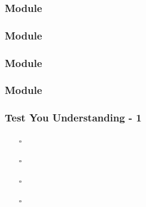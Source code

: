 \documentclass[t, notes, xcolor=table]{beamer}
\begin{document}
\begin{frame}
\frametitle{Module}

\end{frame}
\note{
\scriptsize{


}
}

\begin{frame}
\frametitle{Module}

\end{frame}
\note{
\scriptsize{


}
}

\begin{frame}
\frametitle{Module}

\end{frame}
\note{
\scriptsize{


}
}

\begin{frame}
\frametitle{Module}

\end{frame}
\note{
\scriptsize{


}
}





\begin{frame}
\frametitle{Test You Understanding - 1}

\begin{itemize}
\item[$\square$] 
\item[$\square$] 
\item[$\square$] 
\item[$\square$] 
\end{itemize}
\end{frame}
\note{

}
\end{document}
